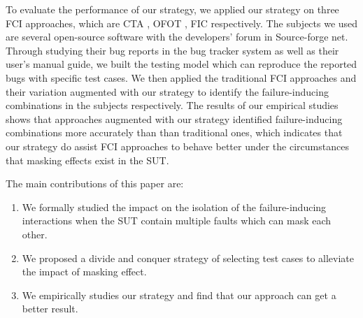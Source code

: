 \documentclass{sig-alternate}
\begin{document}


To evaluate the performance of our strategy, we applied our strategy on three FCI approaches, which are CTA \cite{yilmaz2006covering}, OFOT \cite{nie2011minimal}, FIC \cite{zhang2011characterizing} respectively. The subjects we used are several open-source software with the developers' forum in Source-forge net. Through studying their bug reports in the bug tracker system as well as their user's manual guide, we built the testing model which can reproduce the reported bugs with specific test cases. We then  applied the traditional FCI approaches and their variation augmented with our strategy to identify the failure-inducing combinations in the subjects respectively. The results of our empirical studies shows that approaches augmented with our strategy identified failure-inducing combinations more accurately than than traditional ones, which indicates that our strategy do assist FCI approaches to behave better under the circumstances that masking effects exist in the SUT.

The main contributions of this paper are:
\begin{enumerate}
 \item We formally studied the impact on the isolation of the failure-inducing interactions when the SUT contain multiple faults which can mask each other.
 \item We proposed a divide and conquer strategy of selecting test cases to alleviate the impact of masking effect.
 \item We empirically studies our strategy and find that our approach can get a better result.

\end{enumerate}
\end{document}
